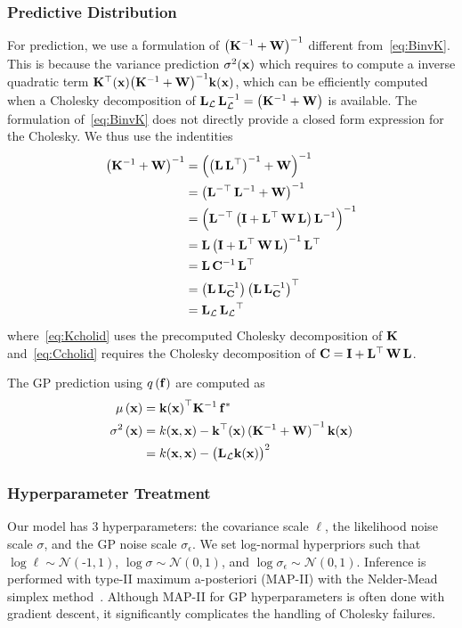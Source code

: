 \subsubsection{Predictive Distribution}
For prediction, we use a formulation of \({\big(\mathbf{K}^{-1} + \mathbf{W}\big)}^{-1}\) different from~\cref{eq:BinvK}.
This is because the variance prediction \(\sigma^2(\mathbf{x})\) which requires to compute a inverse quadratic term \(\mathbf{K}^{\top}(\mathbf{x}) {\big(\mathbf{K}^{-1} + \mathbf{W}\big)}^{-1} \mathbf{k}(\mathbf{x})\), which can be efficiently computed when a Cholesky decomposition of \(\mathbf{L}_{\mathcal{L}} \, \mathbf{L}^{-1}_{\mathcal{L}}  = {\big(\mathbf{K}^{-1} + \mathbf{W}\big)}\) is available.
The formulation of~\cref{eq:BinvK} does not directly provide a closed form expression for the Cholesky.
We thus use the indentities
\begin{align}
  {\big(\mathbf{K}^{-1} + \mathbf{W}\big)}^{-1}
  &= { \Big({\big(\mathbf{L}\,\mathbf{L}^{\top}\big)}^{-1} + \mathbf{W} \Big) }^{-1} \label{eq:Kcholid}  \\
  &= { \big(\mathbf{L}^{-\top}\,\mathbf{L}^{-1} + \mathbf{W} \big) }^{-1}  \\
  &= { \Big( \mathbf{L}^{-\top}\,\big(\mathbf{I} + \mathbf{L}^{\top}\,\mathbf{W}\,\mathbf{L} \big)\,\mathbf{L}^{-1} \Big) }^{-1}  \\
  &= \mathbf{L}\,{\big(\mathbf{I} + \mathbf{L}^{\top}\,\mathbf{W}\,\mathbf{L} \big)}^{-1}\,\mathbf{L}^{\top}  \\
  &= \mathbf{L}\, \mathbf{C}^{-1} \,\mathbf{L}^{\top}  \\
  &= \big( \mathbf{L}\, \mathbf{L}_{\mathbf{C}}^{-1} \big)\, {\big( \mathbf{L}\, \mathbf{L}_{\mathbf{C}}^{-1} \big)}^{\top} \label{eq:Ccholid} \\
  &= \mathbf{L}_{\mathcal{L}} \, { \mathbf{L}_{\mathcal{L}} }^{\top}
\end{align}
where~\cref{eq:Kcholid} uses the precomputed Cholesky decomposition of \(\mathbf{K}\) and~\cref{eq:Ccholid} requires the Cholesky decomposition of \(\mathbf{C} = \mathbf{I} + \mathbf{L}^{\top}\,\mathbf{W}\,\mathbf{L}\).

The GP prediction using \(q\,(\mathbf{f})\) are computed as
\begin{align}
  \mu\,(\mathbf{x})
  &= {\mathbf{k}(\mathbf{x})}^{\top} \mathbf{K}^{-1} \, \mathbf{f}^*  \\
  \sigma^2\,(\mathbf{x})
  &= k(\mathbf{x}, \mathbf{x}) - \mathbf{k}^{\top}(\mathbf{x}) \, {(\mathbf{K}^{-1} + \mathbf{W})}^{-1} \, \mathbf{k}(\mathbf{x}) \\
  &= k(\mathbf{x}, \mathbf{x}) - {\big( \mathbf{L}_{\mathcal{L}} \mathbf{k}(\mathbf{x}) \big)}^2
\end{align}

\subsubsection{Hyperparameter Treatment}
Our model has 3 hyperparameters: the covariance scale \(\ell\), the likelihood noise scale \(\sigma\), and the GP noise scale \(\sigma_\epsilon\).
We set log-normal hyperpriors such that \(\log \ell \sim \mathcal{N}\left(\text{-}1, 1\right)\), \(\log \sigma \sim \mathcal{N}\left(0, 1\right)\), and \(\log \sigma_{\epsilon} \sim \mathcal{N}\left(0, 1\right)\).
Inference is performed with type-II maximum a-posteriori (MAP-II) with the Nelder-Mead simplex method~\cite{nelder_simplex_1965}.
Although MAP-II for GP hyperparameters is often done with gradient descent, it significantly complicates the handling of Cholesky failures.

